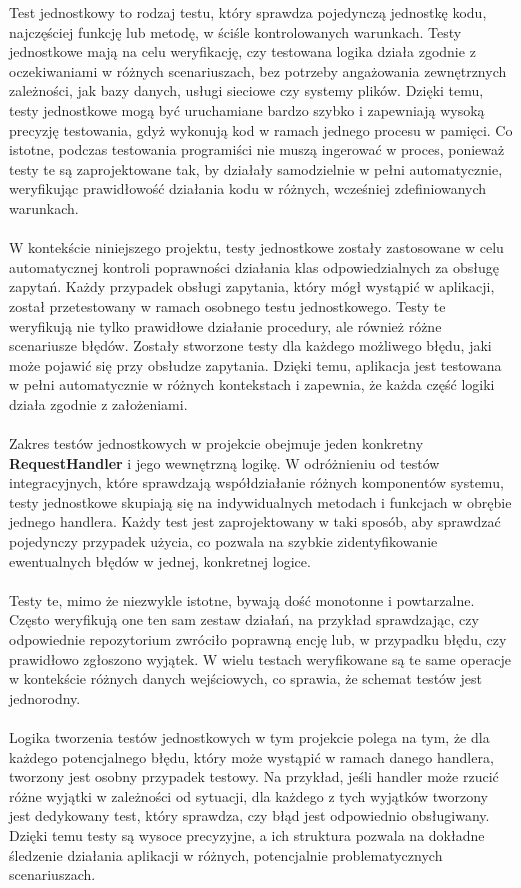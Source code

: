 \documentclass[12pt,a4paper]{article}
\begin{document}
\noindent
Test jednostkowy to rodzaj testu, który sprawdza pojedynczą jednostkę kodu, najczęściej funkcję lub metodę, w ściśle kontrolowanych warunkach. Testy jednostkowe mają na celu weryfikację, czy testowana logika działa zgodnie z oczekiwaniami w różnych scenariuszach, bez potrzeby angażowania zewnętrznych zależności, jak bazy danych, usługi sieciowe czy systemy plików. Dzięki temu, testy jednostkowe mogą być uruchamiane bardzo szybko i zapewniają wysoką precyzję testowania, gdyż wykonują kod w ramach jednego procesu w pamięci. Co istotne, podczas testowania programiści nie muszą ingerować w proces, ponieważ testy te są zaprojektowane tak, by działały samodzielnie w pełni automatycznie, weryfikując prawidłowość działania kodu w różnych, wcześniej zdefiniowanych warunkach.
\\\\
W kontekście niniejszego projektu, testy jednostkowe zostały zastosowane w celu automatycznej kontroli poprawności działania klas odpowiedzialnych za obsługę zapytań. Każdy przypadek obsługi zapytania, który mógł wystąpić w aplikacji, został przetestowany w ramach osobnego testu jednostkowego. Testy te weryfikują nie tylko prawidłowe działanie procedury, ale również różne scenariusze błędów. Zostały stworzone testy dla każdego możliwego błędu, jaki może pojawić się przy obsłudze zapytania. Dzięki temu, aplikacja jest testowana w pełni automatycznie w różnych kontekstach i zapewnia, że każda część logiki działa zgodnie z założeniami.
\\\\
Zakres testów jednostkowych w projekcie obejmuje jeden konkretny \textbf{RequestHandler} i jego wewnętrzną logikę. W odróżnieniu od testów integracyjnych, które sprawdzają współdziałanie różnych komponentów systemu, testy jednostkowe skupiają się na indywidualnych metodach i funkcjach w obrębie jednego handlera. Każdy test jest zaprojektowany w taki sposób, aby sprawdzać pojedynczy przypadek użycia, co pozwala na szybkie zidentyfikowanie ewentualnych błędów w jednej, konkretnej logice.
\\\\
Testy te, mimo że niezwykle istotne, bywają dość monotonne i powtarzalne. Często weryfikują one ten sam zestaw działań, na przykład sprawdzając, czy odpowiednie repozytorium zwróciło poprawną encję lub, w przypadku błędu, czy prawidłowo zgłoszono wyjątek. W wielu testach weryfikowane są te same operacje w kontekście różnych danych wejściowych, co sprawia, że schemat testów jest jednorodny.
\\\\
Logika tworzenia testów jednostkowych w tym projekcie polega na tym, że dla każdego potencjalnego błędu, który może wystąpić w ramach danego handlera, tworzony jest osobny przypadek testowy. Na przykład, jeśli handler może rzucić różne wyjątki w zależności od sytuacji, dla każdego z tych wyjątków tworzony jest dedykowany test, który sprawdza, czy błąd jest odpowiednio obsługiwany. Dzięki temu testy są wysoce precyzyjne, a ich struktura pozwala na dokładne śledzenie działania aplikacji w różnych, potencjalnie problematycznych scenariuszach.
\end{document}
